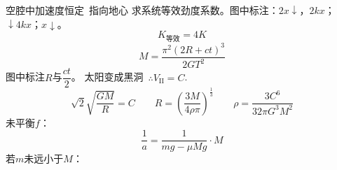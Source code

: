 空腔中加速度恒定\ 指向地心
求系统等效劲度系数。图中标注：$2x\downarrow$，$2kx$；$\downarrow4kx$；$x\downarrow$。
\[
K_{\text{等效}}=4K
\]
\[
M=\frac{\pi^2(2R+ct)^3}{2GT^2}
\]
图中标注$R$与$\dfrac{ct}{2}$。
太阳变成黑洞\ $\therefore V_{\mathrm{II}}=C$.
\[
\sqrt2\sqrt{\frac{GM}{R}}=C\qquad R=\left(\frac{3M}{4\rho\pi}\right)^{\frac13}\qquad\rho=\frac{3C^6}{32\pi G^3M^2}
\] %
未平衡$f$：
\[
\frac{1}{a}=\frac{1}{mg-\mu Mg}\cdot M
\]
若$m$未远小于$M$：
